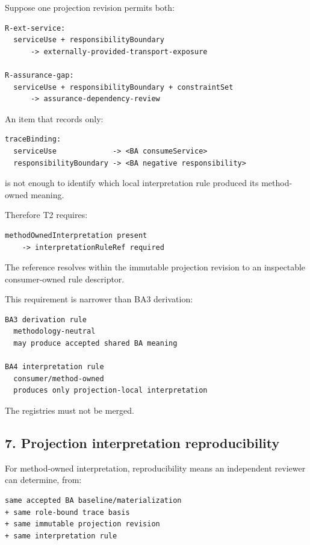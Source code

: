 \documentclass[11pt,a4paper]{article}
\begin{document}
Suppose one projection revision permits both:

\begin{verbatim}
R-ext-service:
  serviceUse + responsibilityBoundary
      -> externally-provided-transport-exposure

R-assurance-gap:
  serviceUse + responsibilityBoundary + constraintSet
      -> assurance-dependency-review
\end{verbatim}

An item that records only:

\begin{verbatim}
traceBinding:
  serviceUse             -> <BA consumeService>
  responsibilityBoundary -> <BA negative responsibility>
\end{verbatim}

is not enough to identify which local interpretation rule produced its
method-owned meaning.

Therefore T2 requires:

\begin{verbatim}
methodOwnedInterpretation present
    -> interpretationRuleRef required
\end{verbatim}

The reference resolves within the immutable projection revision to an
inspectable consumer-owned rule descriptor.

This requirement is narrower than BA3 derivation:

\begin{verbatim}
BA3 derivation rule
  methodology-neutral
  may produce accepted shared BA meaning

BA4 interpretation rule
  consumer/method-owned
  produces only projection-local interpretation
\end{verbatim}

The registries must not be merged.

\subsection{7. Projection interpretation
reproducibility}\label{7-projection-interpretation-reproducibility}

For method-owned interpretation, reproducibility means an independent
reviewer can determine, from:

\begin{verbatim}
same accepted BA baseline/materialization
+ same role-bound trace basis
+ same immutable projection revision
+ same interpretation rule
\end{verbatim}
\end{document}
